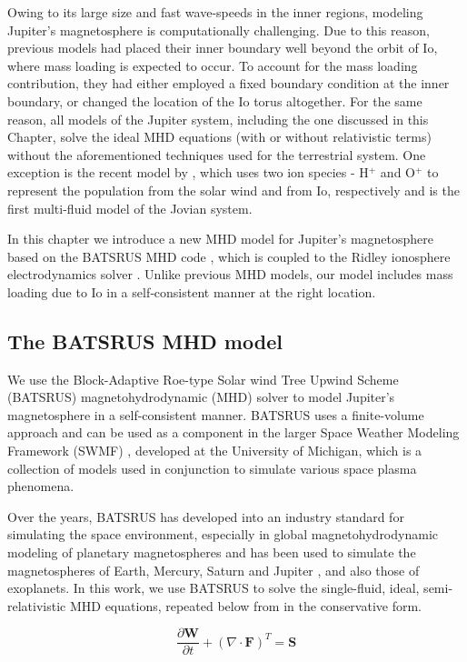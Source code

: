 Owing to its large size and fast wave-speeds in the inner regions, modeling Jupiter's magnetosphere is computationally challenging. Due to this reason, previous models had placed their inner boundary well beyond the orbit of Io, where mass loading is expected to occur. To account for the mass loading contribution, they had either employed a fixed boundary condition at the inner boundary, or changed the location of the Io torus altogether. For the same reason, all models of the Jupiter system, including the one discussed in this Chapter, solve the ideal MHD equations (with or without relativistic terms) without the aforementioned techniques used for the terrestrial system. One exception is the recent model by , which uses two ion species - H$^+$ and O$^+$ to represent the population from the solar wind and from Io, respectively and is the first multi-fluid model of the Jovian system. 

In this chapter we introduce a new MHD model for Jupiter's magnetosphere based on the BATSRUS MHD code \cite{Powell1999a,Gombosi2002b}, which is coupled to the Ridley ionosphere electrodynamics solver \cite{Ridley2004IonosphericConductance}. Unlike previous MHD models, our model includes mass loading due to Io in a self‐consistent manner at the right location.

\subsection{The BATSRUS MHD model}
We use the Block-Adaptive Roe-type Solar wind Tree Upwind Scheme (BATSRUS) magnetohydrodynamic (MHD) solver to model Jupiter's magnetosphere in a self-consistent manner. BATSRUS uses a finite-volume approach and can be used as a component in the larger Space Weather Modeling Framework (SWMF) \cite{Toth2012a}, developed at the University of Michigan, which is a collection of models used in conjunction to simulate various space plasma phenomena. 

Over the years, BATSRUS has developed into an industry standard for simulating the space environment, especially in global magnetohydrodynamic modeling of planetary magnetospheres and has been used to simulate the magnetospheres of Earth, Mercury, Saturn \cite{Jia2012} and Jupiter \cite{Hansen2001a}, and also those of exoplanets. In this work, we use BATSRUS to solve the single-fluid, ideal, semi-relativistic MHD equations, repeated below from  in the conservative form. 

\begin{equation}
    \frac{\partial \mathbf{W}}{\partial t} + \left(\nabla \cdot \mathbf{F} \right)^T = \mathbf{S}
\end{equation}


